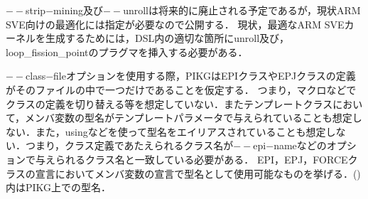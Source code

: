 \documentclass{article}
\begin{document}
  $--$strip$-$mining及び$--$unrollは将来的に廃止される予定であるが，現状ARM SVE向けの最適化には指定が必要なので公開する．
  現状，最適なARM SVEカーネルを生成するためには，DSL内の適切な箇所にunroll及び，loop\_fission\_pointのプラグマを挿入する必要がある．

  $--$class$-$fileオプションを使用する際，PIKGはEPIクラスやEPJクラスの定義がそのファイルの中で一つだけであることを仮定する．
  つまり，マクロなどでクラスの定義を切り替える等を想定していない．またテンプレートクラスにおいて，メンバ変数の型名がテンプレートパラメータで与えられていることも想定しない．また，usingなどを使って型名をエイリアスされていることも想定しない．つまり，クラス定義であたえられるクラス名が$--$epi$-$nameなどのオプションで与えられるクラス名と一致している必要がある．
  EPI，EPJ，FORCEクラスの宣言においてメンバ変数の宣言で型名として使用可能なものを挙げる．()内はPIKG上での型名．
\end{document}
